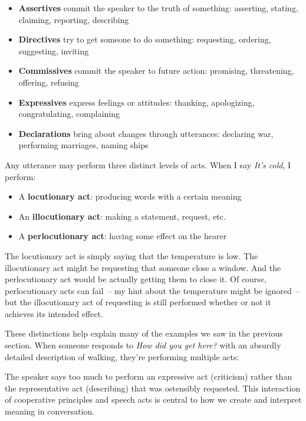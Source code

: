 \begin{itemize}
   \item \textbf{Assertives} commit the speaker to the truth of something: asserting, stating, claiming, reporting, describing
   \item \textbf{Directives} try to get someone to do something: requesting, ordering, suggesting, inviting
   \item \textbf{Commissives} commit the speaker to future action: promising, threatening, offering, refusing
   \item \textbf{Expressives} express feelings or attitudes: thanking, apologizing, congratulating, complaining
   \item \textbf{Declarations} bring about changes through utterances: declaring war, performing marriages, naming ships
\end{itemize}

Any utterance may perform three distinct levels of acts. When I say \textit{It's cold}, I perform:
\begin{itemize}
   \item A \textbf{locutionary act}: producing words with a certain meaning
   \item An \textbf{illocutionary act}: making a statement, request, etc.
   \item A \textbf{perlocutionary act}: having some effect on the hearer
\end{itemize}

The locutionary act is simply saying that the temperature is low. The illocutionary act might be requesting that someone close a window. And the perlocutionary act would be actually getting them to close it. Of course, perlocutionary acts can fail~-- my hint about the temperature might be ignored~-- but the illocutionary act of requesting is still performed whether or not it achieves its intended effect.

These distinctions help explain many of the examples we saw in the previous section. When someone responds to \textit{How did you get here?} with an absurdly detailed description of walking, they're performing multiple acts:

\ea
    \z
\z

The speaker says too much to perform an expressive act (criticism) rather than the representative act (describing) that was ostensibly requested. This interaction of cooperative principles and speech acts is central to how we create and interpret meaning in conversation.


